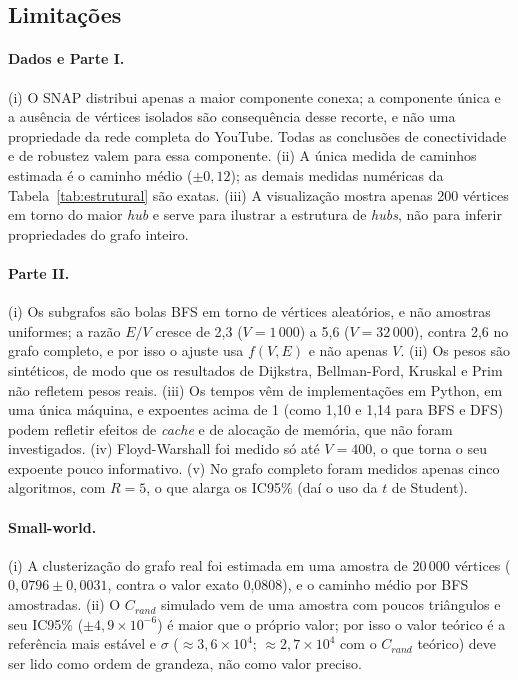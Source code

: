 \documentclass[sigconf]{webmedia}
\begin{document}
\subsection{Limitações}
\label{sec:limitacoes}
\paragraph{Dados e Parte I.} (i) O SNAP distribui apenas a maior componente conexa; a componente única e a ausência de vértices isolados são consequência desse recorte, e não uma propriedade da rede completa do YouTube. Todas as conclusões de conectividade e de robustez valem para essa componente. (ii) A única medida de caminhos estimada é o caminho médio ($\pm0{,}12$); as demais medidas numéricas da Tabela~\ref{tab:estrutural} são exatas. (iii) A visualização mostra apenas 200 vértices em torno do maior \emph{hub} e serve para ilustrar a estrutura de \emph{hubs}, não para inferir propriedades do grafo inteiro.

\paragraph{Parte II.} (i) Os subgrafos são bolas BFS em torno de vértices aleatórios, e não amostras uniformes; a razão $E/V$ cresce de 2,3 ($V=1\,000$) a 5,6 ($V=32\,000$), contra 2,6 no grafo completo, e por isso o ajuste usa $f(V,E)$ e não apenas $V$. (ii) Os pesos são sintéticos, de modo que os resultados de Dijkstra, Bellman-Ford, Kruskal e Prim não refletem pesos reais. (iii) Os tempos vêm de implementações em Python, em uma única máquina, e expoentes acima de 1 (como 1,10 e 1,14 para BFS e DFS) podem refletir efeitos de \emph{cache} e de alocação de memória, que não foram investigados. (iv) Floyd-Warshall foi medido só até $V=400$, o que torna o seu expoente pouco informativo. (v) No grafo completo foram medidos apenas cinco algoritmos, com $R=5$, o que alarga os IC95\% (daí o uso da $t$ de Student).

\paragraph{Small-world.} (i) A clusterização do grafo real foi estimada em uma amostra de 20\,000 vértices ($0{,}0796\pm0{,}0031$, contra o valor exato 0,0808), e o caminho médio por BFS amostradas. (ii) O $C_{rand}$ simulado vem de uma amostra com poucos triângulos e seu IC95\% ($\pm4{,}9\times10^{-6}$) é maior que o próprio valor; por isso o valor teórico é a referência mais estável e $\sigma$ ($\approx3{,}6\times10^{4}$; $\approx2{,}7\times10^{4}$ com o $C_{rand}$ teórico) deve ser lido como ordem de grandeza, não como valor preciso.
\end{document}
